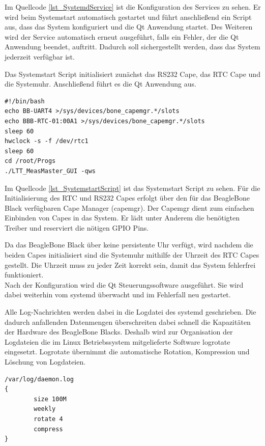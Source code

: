 Im Quellcode \ref{lst_SystemdService} ist die Konfiguration des Services zu sehen. Er wird beim Systemstart automatisch gestartet und führt anschließend ein Script aus, dass das System konfiguriert und die Qt Anwendung startet. Des Weiteren wird der Service automatisch erneut ausgeführt, falls ein Fehler, der die Qt Anwendung beendet, auftritt. Dadurch soll sichergestellt werden, dass das System jederzeit verfügbar ist.\ 

Das Systemstart Script initialisiert zunächst das RS232 Cape, das \ac{RTC} Cape und die Systemuhr. Anschließend führt es die Qt Anwendung aus.\\ 

\begin{lstlisting}[caption={Systemstart Script},label=lst_SystemstartScript]
#!/bin/bash
echo BB-UART4 >/sys/devices/bone_capemgr.*/slots
echo BBB-RTC-01:00A1 >/sys/devices/bone_capemgr.*/slots
sleep 60
hwclock -s -f /dev/rtc1
sleep 60
cd /root/Progs
./LTT_MeasMaster_GUI -qws
\end{lstlisting}

Im Quellcode \ref{lst_SystemstartScript} ist das Systemstart Script zu sehen. Für die Initialisierung des RTC und RS232 Capes erfolgt über den für das BeagleBone Black verfügbaren Cape Manager (capemgr). Der Capemgr \cite{Capemgr} dient zum einfachen Einbinden von Capes in das System. Er lädt unter Anderem die benötigten Treiber und reserviert die nötigen \ac{GPIO} Pins.\ 

Da das BeagleBone Black über keine persistente Uhr verfügt, wird nachdem die beiden Capes initialisiert sind die Systemuhr mithilfe der Uhrzeit des RTC Capes gestellt. Die Uhrzeit muss zu jeder Zeit korrekt sein, damit das System fehlerfrei funktioniert.\\
Nach der Konfiguration wird die Qt Steuerungssoftware ausgeführt. Sie wird dabei weiterhin vom systemd überwacht und im Fehlerfall neu gestartet.\ 

Alle Log-Nachrichten werden dabei in die Logdatei des systemd geschrieben. Die dadurch anfallenden Datenmengen überschreiten dabei schnell die Kapazitäten der Hardware des BeagleBone Blacks. Deshalb wird zur Organisation der Logdateien die im Linux Betriebssystem mitgelieferte Software logrotate \cite{logrotate} eingesetzt. Logrotate übernimmt die automatische Rotation, Kompression und Löschung von Logdateien.\\

\begin{lstlisting}[caption={Logrotate},label=lst_Logrotate]
/var/log/daemon.log
{
        size 100M
        weekly
        rotate 4
        compress
}
\end{lstlisting}

